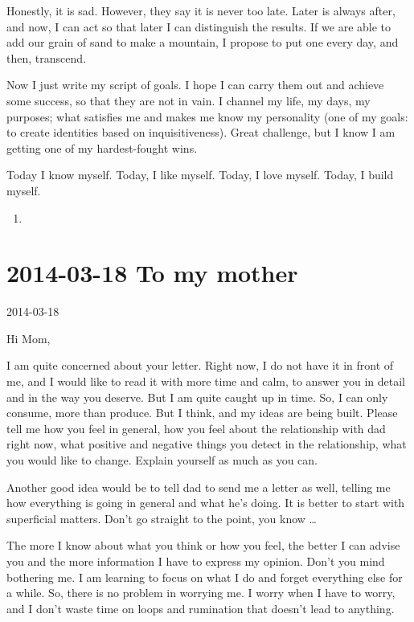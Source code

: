 \documentclass[]{book}
\begin{document}
Honestly, it is sad. However, they say it is never too late. Later is always after, and now, I can act so that later I can distinguish the results. If we are able to add our grain of sand to make a mountain, I propose to put one every day, and then, transcend.

Now I just write my script of goals. I hope I can carry them out and achieve some success, so that they are not in vain. I channel my life, my days, my purposes; what satisfies me and makes me know my personality (one of my goals: to create identities based on inquisitiveness). Great challenge, but I know I am getting one of my hardest-fought wins.

Today I know myself. Today, I like myself. Today, I love myself. Today, I build myself.

\begin{enumerate}
\def\labelenumi{\Alph{enumi}.}
\setcounter{enumi}{11}
\item
\end{enumerate}

\hypertarget{tomother20140318}{%
\section*{2014-03-18 To my mother}\label{tomother20140318}}

2014-03-18

Hi Mom,

I am quite concerned about your letter. Right now, I do not have it in front of me, and I would like to read it with more time and calm, to answer you in detail and in the way you deserve. But I am quite caught up in time. So, I can only consume, more than produce. But I think, and my ideas are being built. Please tell me how you feel in general, how you feel about the relationship with dad right now, what positive and negative things you detect in the relationship, what you would like to change. Explain yourself as much as you can.

Another good idea would be to tell dad to send me a letter as well, telling me how everything is going in general and what he's doing. It is better to start with superficial matters. Don't go straight to the point, you know \ldots{}

The more I know about what you think or how you feel, the better I can advise you and the more information I have to express my opinion. Don't you mind bothering me. I am learning to focus on what I do and forget everything else for a while. So, there is no problem in worrying me. I worry when I have to worry, and I don't waste time on loops and rumination that doesn't lead to anything.
\end{document}
